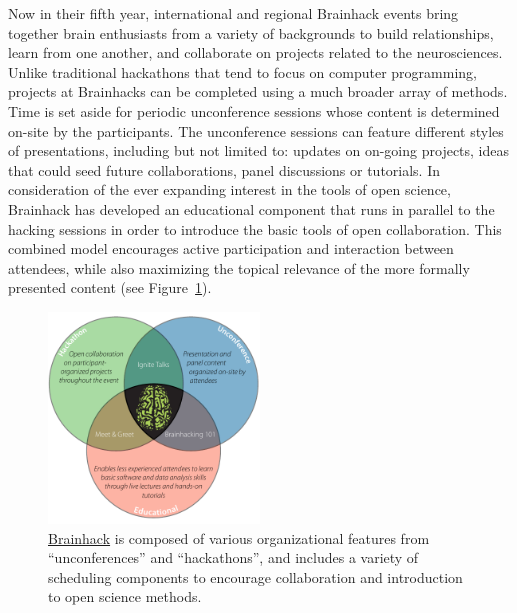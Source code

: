 \documentclass[11pt]{bmc_article_s50}
\begin{document}
Now in their fifth year, international and regional Brainhack events bring together brain enthusiasts from a variety of backgrounds to build relationships, learn from one another, and collaborate on projects related to the neurosciences. Unlike traditional hackathons that tend to focus on computer programming, projects at Brainhacks can be completed using a much broader array of methods. Time is set aside for periodic unconference sessions whose content is determined on-site by the participants. The unconference sessions can feature different styles of presentations, including but not limited to: updates on on-going projects, ideas that could seed future collaborations, panel discussions or tutorials. In consideration of the ever expanding interest in the tools of open science, Brainhack has developed an educational component that runs in parallel to the hacking sessions in order to introduce the basic tools of open collaboration. This combined model encourages active participation and interaction between attendees, while also maximizing the topical relevance of the more formally presented content (see Figure~\ref{fig1}).

\begin{figure}[htp]
\begin{center}
  \includegraphics[width=0.5\textwidth]{Figure_01}
  \caption{\href{http://www.brainhack.org}{Brainhack} is composed of various organizational features from ``unconferences'' and ``hackathons'', and includes a variety of scheduling components to encourage collaboration and introduction to open science methods.}
  \label{fig1}
\end{center}
\end{figure}
\end{document}
